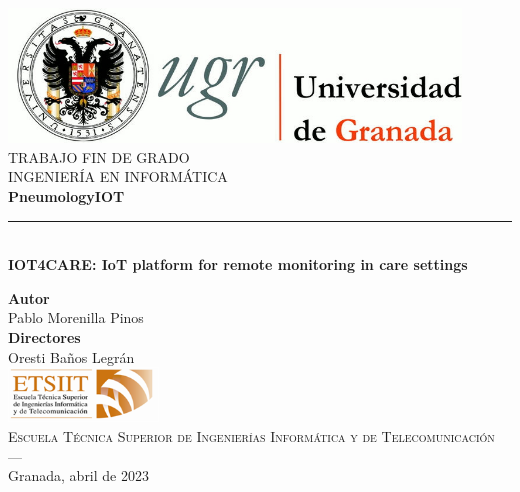 \begin{titlepage}
 
 
\newlength{\centeroffset}
\setlength{\centeroffset}{-0.5\oddsidemargin}
\addtolength{\centeroffset}{0.5\evensidemargin}
\thispagestyle{empty}

\noindent\hspace*{\centeroffset}\begin{minipage}{\textwidth}

\centering
\includegraphics[width=0.9\textwidth]{imagenes/logo_ugr.jpg}\\[1.4cm]

\textsc{ \Large TRABAJO FIN DE GRADO\\[0.2cm]}
\textsc{ INGENIERÍA EN INFORMÁTICA}\\[1cm]
% 
{\Huge\bfseries PneumologyIOT\\
}
\noindent\rule[-1ex]{\textwidth}{3pt}\\[3.5ex]
{\large\bfseries IOT4CARE: IoT platform for remote
monitoring in care settings}
\end{minipage}

\vspace{2.5cm}
\noindent\hspace*{\centeroffset}\begin{minipage}{\textwidth}
\centering

\textbf{Autor}\\ {Pablo Morenilla Pinos}\\[2.5ex]
\textbf{Directores}\\
{Oresti Baños Legrán\\[2cm]
\includegraphics[width=0.3\textwidth]{imagenes/etsiit_logo.png}\\[0.1cm]
\textsc{Escuela Técnica Superior de Ingenierías Informática y de Telecomunicación}\\
\textsc{---}\\
}
Granada, abril de 2023
\end{minipage}
\end{titlepage}


